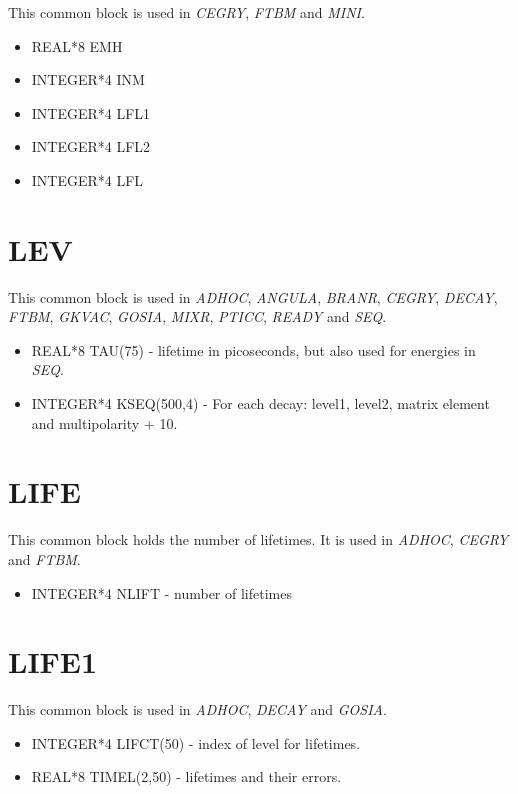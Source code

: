 This common block is used in {\em CEGRY}, {\em FTBM} and {\em MINI}.

\begin{itemize}
\item REAL*8 EMH
\item INTEGER*4 INM
\item INTEGER*4 LFL1
\item INTEGER*4 LFL2
\item INTEGER*4 LFL
\end{itemize}

\section{LEV}

This common block is used in {\em ADHOC}, {\em ANGULA}, {\em BRANR}, {\em
CEGRY}, {\em DECAY}, {\em FTBM}, {\em GKVAC}, {\em GOSIA}, {\em MIXR}, {\em
PTICC}, {\em READY} and {\em SEQ}.

\begin{itemize}
\item REAL*8 TAU(75) - lifetime in picoseconds, but also used for energies
in {\em SEQ}.
\item INTEGER*4 KSEQ(500,4) - For each decay: level1, level2, matrix element
and multipolarity + 10.
\end{itemize}

\section{LIFE}

This common block holds the number of lifetimes. It is used in {\em ADHOC},
{\em CEGRY} and {\em FTBM}.

\begin{itemize}
\item INTEGER*4 NLIFT - number of lifetimes
\end{itemize}

\section{LIFE1}

This common block is used in {\em ADHOC}, {\em DECAY} and {\em GOSIA}.

\begin{itemize}
\item INTEGER*4 LIFCT(50) - index of level for lifetimes.
\item REAL*8 TIMEL(2,50) - lifetimes and their errors.
\end{itemize}

